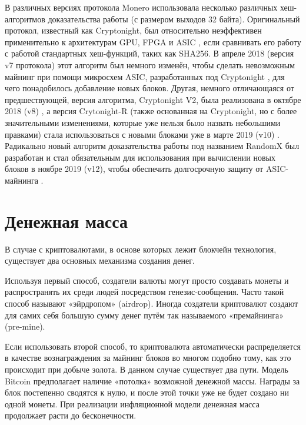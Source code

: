 В различных версиях протокола Monero использовала несколько различных хеш-алгоритмов доказательства работы (с размером выходов 32 байта). Оригинальный протокол, известный как Cryptonight, был относительно неэффективен применительно к архитектурам GPU, FPGA и ASIC \cite{CryptoNight}, если сравнивать его работу с работой стандартных хеш-функций, таких как SHA256. В апреле 2018 (версия v7 протокола) этот алгоритм был немного изменён, чтобы сделать невозможным майнинг при помощи микросхем ASIC, разработанных под Cryptonight \cite{cryptonight7}, для чего понадобилось добавление новых блоков. Другая, немного отличающаяся от предшествующей, версия алгоритма, Cryptonight V2, была реализована в октябре 2018 (v8) \cite{berylliumbullet-v8}, а версия Crytonight-R (также основанная на Cryptonight, но с более значительными изменениями, которые уже нельзя было назвать небольшими правками) стала использоваться с новыми блоками уже в марте 2019 (v10) \cite{boronbutterfly-v10}. Радикально новый алгоритм доказательства работы под названием RandomX \cite{randomx-pr-5549} был разработан и стал обязательным для использования при вычислении новых блоков в ноябре 2019 (v12), чтобы обеспечить долгосрочную защиту от ASIC-майнинга \cite{randomx}.



\section{Денежная масса}
\label{sec:money-supply}

В случае с криптовалютами, в основе которых лежит блокчейн технология, существует два основных механизма создания денег.

Используя первый способ, создатели валюты могут просто создавать монеты и распростра\-нять их среди людей посредством генезис-сообщения. Часто такой способ называют  «эйрдро\-пом» (airdrop). Иногда создатели криптовалют создают для самих себя большую сумму денег путём так называемого «премайнинга» (pre-mine). \cite{premine-description}

Если использовать второй способ, то криптовалюта автоматически распределяется в качестве вознаграждения за майнинг блоков во многом подобно тому, как это происходит при добыче золота. В данном случае существует два пути. Модель Bitcoin предполагает наличие «потол\-ка» возможной денежной массы. Награды за блок постепенно сводятся к нулю, и после этой точки уже не будет создано ни одной монеты. При реализации инфляционной модели денежная масса продолжает расти до бесконечности. 

